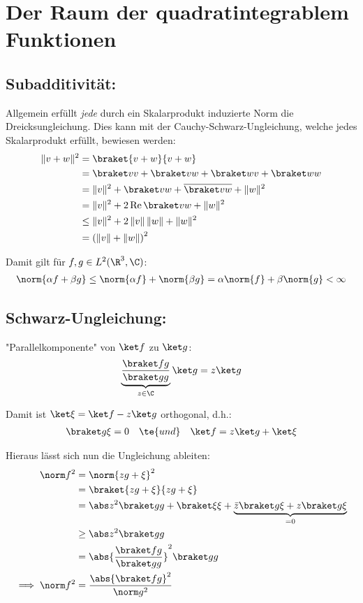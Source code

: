 \documentclass[ex]{exercise}
\begin{document}
\section{Der Raum der quadratintegrablem Funktionen}
\subsection{Subadditivität:}
Allgemein erfüllt \emph{jede} durch ein Skalarprodukt induzierte Norm die Dreicksungleichung.
Dies kann mit der Cauchy-Schwarz-Ungleichung, welche jedes Skalarprodukt erfüllt, 
bewiesen werden:
\begin{align*}
    \| v + w \|^2 & = \braket{v + w}{v + w} \\
    &= \braket vv + \braket vw + \braket wv +\braket ww \\
    &= \| v \|^2 + \braket vw + \overline{\braket v w} + \| w \|^2 \\ 
    & = \| v \|^2 + 2 \operatorname{Re} \braket v w + \| w \|^2 \\
    &\leq \| v \|^2 + 2 \, \| v \| \, \| w \| + \| w \|^2 \\
    &= \left( \| v \| + \| w \| \right)^2
\end{align*}

Damit gilt für \(f,g\in L^2(\R^3,\C)\):
\begin{align*}
    \norm{\alpha f +\beta g}
    \le \norm{\alpha f} + \norm{\beta g}
    = \alpha \norm{f} + \beta \norm{g}< \infty
\end{align*}

\subsection{Schwarz-Ungleichung:}

"{}Parallelkomponente"{} von \(\ket f\) zu \(\ket g\):
\begin{align*}
    \underbrace{\frac{\braket fg}{\braket gg}}_{z\in\C} \ket g = z \ket g
\end{align*}

Damit ist \(\ket \xi = \ket f - z\ket g\) orthogonal, d.h.:
\begin{align*}
    \braket g\xi = 0 \quad\te{und}\quad \ket f = z \ket g + \ket \xi
\end{align*}

Hieraus lässt sich nun die Ungleichung ableiten:
\begin{align*}
    \norm f^2 &= \norm{z g + \xi}^2\\
    &= \braket{z g + \xi}{z g + \xi}\\
    &= \abs z ^2 \braket gg + \braket \xi\xi + \underbrace{\bar z \braket g\xi
    + z \braket g\xi}_{=0}\\
    &\ge \abs z ^2 \braket gg\\
    &= \abs{\frac{\braket fg}{\braket gg}} ^2 \braket gg\\
    \implies \norm f^2&= \frac{\abs{\braket fg}^2}{\norm g^2}
\end{align*}
\end{document}
